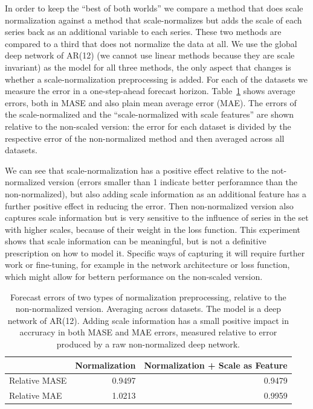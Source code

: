 \documentclass[a4paper]{article}
\theoremstyle{custom}
\begin{document}
In order to keep the ``best of both worlds'' we compare a method that does scale normalization against a method that scale-normalizes but adds the scale of each series back as an additional variable to each series. These two methods are compared to a third that does not normalize the data at all.
 We use the global deep network of AR(12) (we cannot use linear methods because they are scale invariant) as the model for all three methods, the only aspect that changes is whether a scale-normalization preprocessing is added.
 For each of the datasets we measure the error in a one-step-ahead forecast horizon. Table~\ref{tab:scalenorm} shows average errors, both in MASE and also plain mean average error (MAE). The errors of the scale-normalized and the ``scale-normalized with scale features'' are shown relative to the non-scaled version: the error for each dataset is divided by the respective error of the non-normalized method and then averaged across all datasets. 

We can see that scale-normalization has a positive effect relative to the not-normalized version (errors smaller than 1 indicate better perforamnce than the non-normalized), but also adding scale information as an additional feature has a further positive effect in reducing the error. Then non-normalized version also captures scale information but is very sensitive to the influence of series in the set with higher scales, because of their weight in the loss function. 
This experiment shows that scale information can be meaningful, but is not a definitive prescription on how to model it. Specific ways of capturing it will require further work or fine-tuning, for example in the network architecture or loss function, which might allow for bettern performance on the non-scaled version.


\begin{table}[ht]
\centering
\begin{tabular}{lrr}
\toprule
     & Normalization & Normalization + Scale as Feature \\
\midrule
Relative MASE & 0.9497        & 0.9479 \\
Relative MAE  & 1.0213        & 0.9959 \\
\bottomrule
\end{tabular}
\caption{Forecast errors of two types of normalization preprocessing, relative to the non-normalized version. Averaging across datasets. The model is a deep network of AR(12). Adding scale information has a small positive impact in accruracy in both MASE and MAE errors, measured relative to error produced by a raw non-normalized deep network.}
\label{tab:scalenorm}
\end{table}
\end{document}
